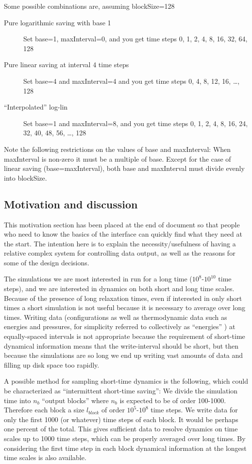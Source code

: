 \documentclass[a4paper]{article}
\begin{document}
Some possible combinations are, assuming blockSize=128

\begin{description}
\item[Pure logarithmic saving with base 1] Set base=1, maxInterval=0, and you
get time steps 0, 1, 2, 4, 8, 16, 32, 64, 128
\item[Pure linear saving at interval 4 time steps] Set base=4 and maxInterval=4
and you get time steps 0, 4, 8, 12, 16, \ldots, 128
\item[``Interpolated'' log-lin] Set base=1 and maxInterval=8, and you
get time steps 0, 1, 2, 4, 8, 16, 24, 32, 40, 48, 56, \ldots, 128
\end{description}


Note the following restrictions on the values of base
and maxInterval:  When maxInterval is non-zero it must be a 
multiple of base. Except for the case of linear saving (base=maxInterval), both
base and maxInterval must divide evenly into blockSize. 



\subsection{Motivation and discussion}

This motivation section has been placed at the end of document so that people 
who need to know the basics of the interface can quickly find what they need
at the start. The intention here is to explain the necessity/usefulness of
 having a relative complex system for controlling data output, as well as the
reasons for some of the design decisions.


The simulations we are most interested in run for a long time 
($10^8$-$10^{10}$ time steps), and we are interested in dynamics on both short 
and long time scales. Because of the presence of long relaxation times, even if
interested in only short times a short simulation is not useful 
because it is necessary to average over long times.
Writing data (configurations as well as thermodynamic
data such as energies and pressures, for simplicity referred to collectively
as ``energies'' ) at equally-spaced intervals is not appropriate because the 
requirement of short-time dynamical information means that the write-interval
should be short, but then because the simulations are so long we end up writing
vast amounts of data and filling up disk space too rapidly.

A possible method for sampling short-time  dynamics is the following, which 
could be characterized as ``intermittent short-time saving'': We 
divide the simulation time
into $n_b$ ``output blocks'' where $n_b$ is expected to be of order 100-1000. 
Therefore each block a size $l_{block}$ of order
 $10^5$-$10^8$ time steps. We  write 
data for only the first 1000 (or whatever) time steps of each block. It would be
perhaps one percent of the total. This gives
sufficient data to resolve dynamics on time scales up to 1000 time steps, which
can be properly averaged over long times. By considering the first time step
in each block dynamical information at the longest time scales is also 
available.
\end{document}
